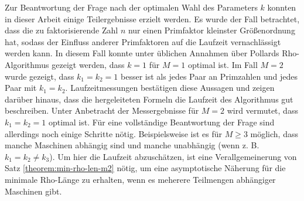 \documentclass[a4paper, 10pt, ngerman]{article}
\begin{document}
    Zur Beantwortung der Frage nach der optimalen Wahl des Parameters $k$ konnten in dieser Arbeit einige Teilergebnisse erzielt werden. Es wurde der Fall betrachtet, dass die zu faktorisierende Zahl $n$ nur einen Primfaktor kleinster Größenordnung hat, sodass der Einfluss anderer Primfaktoren auf die Laufzeit vernachlässigt werden kann. In diesem Fall konnte unter üblichen Annahmen über Pollards Rho-Algorithmus gezeigt werden, dass $k = 1$ für $M = 1$ optimal ist. Im Fall $M = 2$ wurde gezeigt, dass $k_1 = k_2 = 1$ besser ist als jedes Paar an Primzahlen und jedes Paar mit $k_1 = k_2$. Laufzeitmessungen bestätigen diese Aussagen und zeigen darüber hinaus, dass die hergeleiteten Formeln die Laufzeit des Algorithmus gut beschreiben. Unter Anbetracht der Messergebnisse für $M = 2$ wird vermutet, dass $k_1 = k_2 = 1$ optimal ist. Für eine vollständige Beantwortung der Frage sind allerdings noch einige Schritte nötig. Beispielsweise ist es für $M \ge 3$ möglich, dass manche Maschinen abhängig sind und manche unabhängig (wenn z. B. $k_1 = k_2 \ne k_3$). Um hier die Laufzeit abzuschätzen, ist eine Verallgemeinerung von Satz \ref{theorem:min-rho-len-m2} nötig, um eine asymptotische Näherung für die minimale Rho-Länge zu erhalten, wenn es meherere Teilmengen abhängiger Maschinen gibt.

\printbibliography
\end{document}
